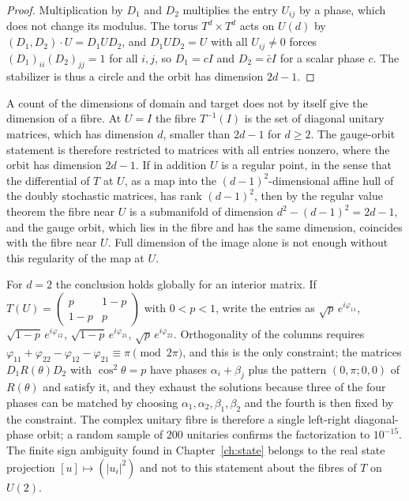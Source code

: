 \documentclass[11pt,oneside]{book}
\theoremstyle{definition}
\theoremstyle{remark}
\begin{document}
\begin{proof}
Multiplication by $D_1$ and $D_2$ multiplies the entry $U_{ij}$ by a phase, which does not change its modulus. The torus $T^d\times T^d$ acts on $U(d)$ by $(D_1,D_2)\cdot U=D_1UD_2$, and $D_1UD_2=U$ with all $U_{ij}\neq0$ forces $(D_1)_{ii}(D_2)_{jj}=1$ for all $i,j$, so $D_1=cI$ and $D_2=\bar cI$ for a scalar phase $c$. The stabilizer is thus a circle and the orbit has dimension $2d-1$.
\end{proof}

A count of the dimensions of domain and target does not by itself give the dimension of a fibre. At $U=I$ the fibre $T^{-1}(I)$ is the set of diagonal unitary matrices, which has dimension $d$, smaller than $2d-1$ for $d\geq2$. The gauge-orbit statement is therefore restricted to matrices with all entries nonzero, where the orbit has dimension $2d-1$. If in addition $U$ is a regular point, in the sense that the differential of $T$ at $U$, as a map into the $(d-1)^2$-dimensional affine hull of the doubly stochastic matrices, has rank $(d-1)^2$, then by the regular value theorem the fibre near $U$ is a submanifold of dimension $d^2-(d-1)^2=2d-1$, and the gauge orbit, which lies in the fibre and has the same dimension, coincides with the fibre near $U$. Full dimension of the image alone is not enough without this regularity of the map at $U$.

For $d=2$ the conclusion holds globally for an interior matrix. If $T(U)=\begin{pmatrix}p&1-p\\1-p&p\end{pmatrix}$ with $0<p<1$, write the entries as $\sqrt p\,e^{i\varphi_{11}}$, $\sqrt{1-p}\,e^{i\varphi_{12}}$, $\sqrt{1-p}\,e^{i\varphi_{21}}$, $\sqrt p\,e^{i\varphi_{22}}$. Orthogonality of the columns requires $\varphi_{11}+\varphi_{22}-\varphi_{12}-\varphi_{21}\equiv\pi\pmod{2\pi}$, and this is the only constraint; the matrices $D_1R(\theta)D_2$ with $\cos^2\theta=p$ have phases $\alpha_i+\beta_j$ plus the pattern $(0,\pi;0,0)$ of $R(\theta)$ and satisfy it, and they exhaust the solutions because three of the four phases can be matched by choosing $\alpha_1,\alpha_2,\beta_1,\beta_2$ and the fourth is then fixed by the constraint. The complex unitary fibre is therefore a single left-right diagonal-phase orbit; a random sample of $200$ unitaries confirms the factorization to $10^{-15}$. The finite sign ambiguity found in Chapter~\ref{ch:state} belongs to the real state projection $[u]\mapsto(|u_i|^2)$ and not to this statement about the fibres of $T$ on $U(2)$.
\end{document}
